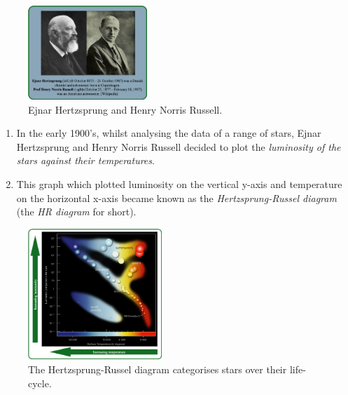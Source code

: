 \documentclass{article}
\begin{document}
    
    
    \begin{figure}[h!]
        \centering
        \includegraphics[width=0.4\textwidth]{Images/hertzsprung-russell.png}
        \caption{Ejnar Hertzsprung and Henry Norris Russell.}
        \label{hertz-russell}
    \end{figure}



    \begin{enumerate}[label=\color{dgreen}\theenumi]
        \item In the early 1900's, whilst analysing the data of a range of stars, Ejnar Hertzsprung and Henry Norris Russell decided to plot the \emph{\textcolor{dblue}{luminosity of the stars against their temperatures}}.
        
        \item This graph which plotted luminosity on the vertical y-axis and temperature on the horizontal x-axis became known as the \emph{\textcolor{dblue}{Hertzsprung-Russel diagram}} (the \emph{\textcolor{dblue}{HR diagram}} for short).
    \end{enumerate}
    
    
    
    \begin{figure}[h!]
        \centering
        \includegraphics[width=0.45\textwidth]{Images/hrd.png}
        \caption{The Hertzsprung-Russel diagram categorises stars over their life-cycle.}
        \label{hrd}
    \end{figure}
    
\end{document}
